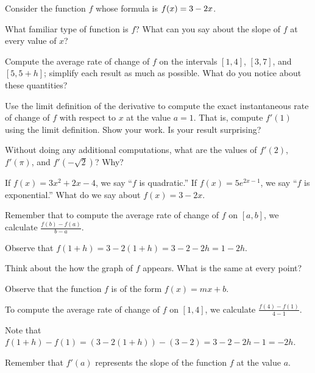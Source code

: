\begin{activity} \label{A:2.1.1}
Consider the function $f$ whose formula is $\displaystyle f(x) = 3 - 2x$.
\ba
	\item What familiar type of function is $f$?  What can you say about the slope of $f$ at every value of $x$?
	\item Compute the average rate of change of $f$ on the intervals $[1,4]$, $[3,7]$, and $[5,5+h]$; simplify each result as much as possible.  What do you notice about these quantities?
	\item Use the limit definition of the derivative to compute the exact instantaneous rate of change of $f$ with respect to $x$ at the value $a = 1$.  That is, compute $f'(1)$ using the limit definition.  Show your work.  Is your result surprising?
	\item Without doing any additional computations, what are the values of $f'(2)$, $f'(\pi)$, and $f'(-\sqrt{2})$?  Why?
\ea
\end{activity}
\begin{smallhint}
\ba
	\item If $f(x) = 3x^2 + 2x - 4$, we say ``$f$ is quadratic.''  If $f(x) = 5 e^{2x-1}$, we say ``$f$ is exponential.''  What do we say about $f(x) = 3-2x$.  
	\item Remember that to compute the average rate of change of $f$ on $[a,b]$, we calculate $\frac{f(b)-f(a)}{b-a}$.
	\item Observe that $f(1+h) = 3 - 2(1+h) = 3 - 2 - 2h = 1 - 2h$.
	\item Think about the how the graph of $f$ appears.  What is the same at every point?
\ea
\end{smallhint}
\begin{bighint}
\ba
	\item Observe that the function $f$ is of the form $f(x) = mx + b$.
	\item To compute the average rate of change of $f$ on $[1,4]$, we calculate $\frac{f(4)-f(1)}{4-1}$.
	\item Note that $f(1+h) - f(1) = (3 - 2(1+h)) - (3-2) = 3 - 2 - 2h - 1 = -2h$.
	\item Remember that $f'(a)$ represents the slope of the function $f$ at the value $a$.
\ea
\end{bighint}

